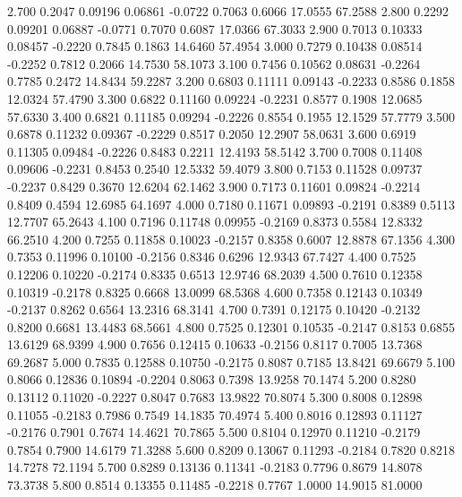    2.700   0.2047   0.09196   0.06861  -0.0722   0.7063   0.6066  17.0555  67.2588
   2.800   0.2292   0.09201   0.06887  -0.0771   0.7070   0.6087  17.0366  67.3033
   2.900   0.7013   0.10333   0.08457  -0.2220   0.7845   0.1863  14.6460  57.4954
   3.000   0.7279   0.10438   0.08514  -0.2252   0.7812   0.2066  14.7530  58.1073
   3.100   0.7456   0.10562   0.08631  -0.2264   0.7785   0.2472  14.8434  59.2287
   3.200   0.6803   0.11111   0.09143  -0.2233   0.8586   0.1858  12.0324  57.4790
   3.300   0.6822   0.11160   0.09224  -0.2231   0.8577   0.1908  12.0685  57.6330
   3.400   0.6821   0.11185   0.09294  -0.2226   0.8554   0.1955  12.1529  57.7779
   3.500   0.6878   0.11232   0.09367  -0.2229   0.8517   0.2050  12.2907  58.0631
   3.600   0.6919   0.11305   0.09484  -0.2226   0.8483   0.2211  12.4193  58.5142
   3.700   0.7008   0.11408   0.09606  -0.2231   0.8453   0.2540  12.5332  59.4079
   3.800   0.7153   0.11528   0.09737  -0.2237   0.8429   0.3670  12.6204  62.1462
   3.900   0.7173   0.11601   0.09824  -0.2214   0.8409   0.4594  12.6985  64.1697
   4.000   0.7180   0.11671   0.09893  -0.2191   0.8389   0.5113  12.7707  65.2643
   4.100   0.7196   0.11748   0.09955  -0.2169   0.8373   0.5584  12.8332  66.2510
   4.200   0.7255   0.11858   0.10023  -0.2157   0.8358   0.6007  12.8878  67.1356
   4.300   0.7353   0.11996   0.10100  -0.2156   0.8346   0.6296  12.9343  67.7427
   4.400   0.7525   0.12206   0.10220  -0.2174   0.8335   0.6513  12.9746  68.2039
   4.500   0.7610   0.12358   0.10319  -0.2178   0.8325   0.6668  13.0099  68.5368
   4.600   0.7358   0.12143   0.10349  -0.2137   0.8262   0.6564  13.2316  68.3141
   4.700   0.7391   0.12175   0.10420  -0.2132   0.8200   0.6681  13.4483  68.5661
   4.800   0.7525   0.12301   0.10535  -0.2147   0.8153   0.6855  13.6129  68.9399
   4.900   0.7656   0.12415   0.10633  -0.2156   0.8117   0.7005  13.7368  69.2687
   5.000   0.7835   0.12588   0.10750  -0.2175   0.8087   0.7185  13.8421  69.6679
   5.100   0.8066   0.12836   0.10894  -0.2204   0.8063   0.7398  13.9258  70.1474
   5.200   0.8280   0.13112   0.11020  -0.2227   0.8047   0.7683  13.9822  70.8074
   5.300   0.8008   0.12898   0.11055  -0.2183   0.7986   0.7549  14.1835  70.4974
   5.400   0.8016   0.12893   0.11127  -0.2176   0.7901   0.7674  14.4621  70.7865
   5.500   0.8104   0.12970   0.11210  -0.2179   0.7854   0.7900  14.6179  71.3288
   5.600   0.8209   0.13067   0.11293  -0.2184   0.7820   0.8218  14.7278  72.1194
   5.700   0.8289   0.13136   0.11341  -0.2183   0.7796   0.8679  14.8078  73.3738
   5.800   0.8514   0.13355   0.11485  -0.2218   0.7767   1.0000  14.9015  81.0000
